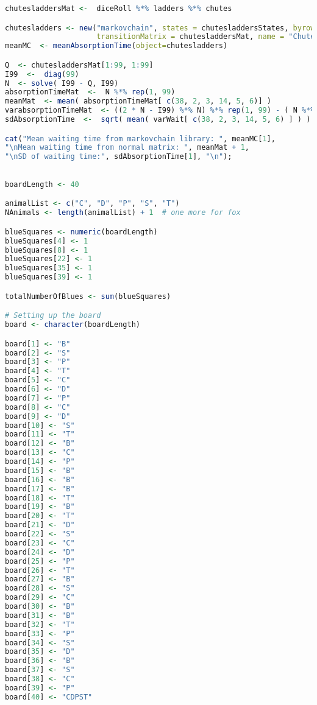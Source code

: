 \begin{description}
\begin{lstlisting}[language=R]
chutesladdersMat <-  diceRoll %*% ladders %*% chutes

chutesladders <- new("markovchain", states = chutesladdersStates, byrow = TRUE,
                     transitionMatrix = chutesladdersMat, name = "ChutesLadders")
meanMC  <- meanAbsorptionTime(object=chutesladders)

Q  <- chutesladdersMat[1:99, 1:99]
I99  <-  diag(99)
N  <- solve( I99 - Q, I99)
absorptionTimeMat  <-  N %*% rep(1, 99)
meanMat  <- mean( absorptionTimeMat[ c(38, 2, 3, 14, 5, 6)] )
varabsorptionTimeMat  <- ((2 * N - I99) %*% N) %*% rep(1, 99) - ( N %*% rep(1, 99) )^2
sdAbsorptionTime  <-  sqrt( mean( varWait[ c(38, 2, 3, 14, 5, 6) ] ) )

cat("Mean waiting time from markovchain library: ", meanMC[1],
"\nMean waiting time from normal matrix: ", meanMat + 1,
"\nSD of waiting time:", sdAbsorptionTime[1], "\n");

\end{lstlisting}

\item[R] 


\begin{lstlisting}[language=R]

boardLength <- 40

animalList <- c("C", "D", "P", "S", "T")
NAnimals <- length(animalList) + 1  # one more for fox

blueSquares <- numeric(boardLength)
blueSquares[4] <- 1
blueSquares[8] <- 1
blueSquares[22] <- 1
blueSquares[35] <- 1
blueSquares[39] <- 1

totalNumberOfBlues <- sum(blueSquares)

# Setting up the board
board <- character(boardLength)

board[1] <- "B"
board[2] <- "S"
board[3] <- "P"
board[4] <- "T"
board[5] <- "C"
board[6] <- "D"
board[7] <- "P"
board[8] <- "C"
board[9] <- "D"
board[10] <- "S"
board[11] <- "T"
board[12] <- "B"
board[13] <- "C"
board[14] <- "P"
board[15] <- "B"
board[16] <- "B"
board[17] <- "B"
board[18] <- "T"
board[19] <- "B"
board[20] <- "T"
board[21] <- "D"
board[22] <- "S"
board[23] <- "C"
board[24] <- "D"
board[25] <- "P"
board[26] <- "T"
board[27] <- "B"
board[28] <- "S"
board[29] <- "C"
board[30] <- "B"
board[31] <- "B"
board[32] <- "T"
board[33] <- "P"
board[34] <- "S"
board[35] <- "D"
board[36] <- "B"
board[37] <- "S"
board[38] <- "C"
board[39] <- "P"
board[40] <- "CDPST"


\end{lstlisting}
\end{description}

